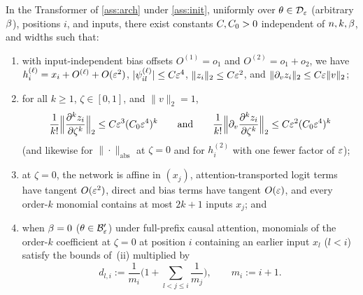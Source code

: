\begin{proposition}
\label{prop:network}
In the Transformer of \cref{ass:arch} under \cref{ass:init}, uniformly over $\theta \in \mathcal D_{\varepsilon}$ (arbitrary $\beta$), positions $i$, and inputs, there exist constants $C, C_0 > 0$ independent of $n, k, \beta$, and widths such that:
\begin{enumerate}[label=(\roman*),leftmargin=*]
\item with input-independent bias offsets $O^{(1)} = o_1$ and $O^{(2)} = o_1 + o_2$, we have $h_i^{(\ell)} = x_i + O^{(\ell)} + O(\varepsilon^2)$, $|\psi_{il}^{(\ell)}| \le C\varepsilon^4$, $\|z_i\|_2 \le C\varepsilon^2$, and $\|\partial_v z_i\|_2 \le C\varepsilon\|v\|_2$;
\item for all $k \ge 1$, $\zeta \in [0,1]$, and $\|v\|_2 = 1$,
\[
  \frac{1}{k!}\Bigl\|\frac{\partial^k z_i}{\partial\zeta^k}\Bigr\|_2 \le C\varepsilon^3(C_0\varepsilon^4)^k
  \qquad\text{and}\qquad
  \frac{1}{k!}\Bigl\|\partial_v\frac{\partial^k z_i}{\partial\zeta^k}\Bigr\|_2 \le C\varepsilon^2(C_0\varepsilon^4)^k
\]
(and likewise for $\|\cdot\|_{\mathrm{abs}}$ at $\zeta = 0$ and for $h^{(2)}_i$ with one fewer factor of $\varepsilon$);
\item at $\zeta = 0$, the network is affine in $(x_j)$, attention-transported logit terms have tangent $O(\varepsilon^2)$, direct and bias terms have tangent $O(\varepsilon)$, and every order-$k$ monomial contains at most $2k + 1$ inputs $x_j$; and
\item when $\beta = 0$ ($\theta \in \mathcal B_{\varepsilon}'$) under full-prefix causal attention, monomials of the order-$k$ coefficient at $\zeta = 0$ at position $i$ containing an earlier input $x_l$ ($l < i$) satisfy the bounds of~(ii) multiplied by
\begin{equation}
 d_{l,i} := \frac{1}{m_i}\Biggl(1 + \sum_{l < j \le i} \frac{1}{m_j}\Biggr), \qquad m_i := i + 1.
 \label{eq:dilution}
\end{equation}
\end{enumerate}
\end{proposition}
